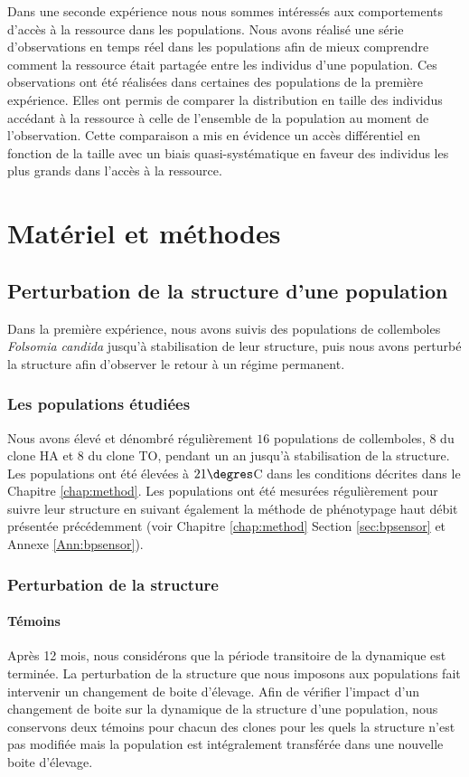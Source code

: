 Dans une seconde expérience nous nous sommes intéressés aux comportements
d'accès à la ressource dans les populations. Nous avons réalisé une série
d'observations en temps réel dans les populations afin de mieux comprendre
comment la ressource était partagée entre les individus d'une population. Ces
observations ont été réalisées dans certaines des populations de la première
expérience. Elles ont permis de comparer la distribution en taille des individus
accédant à la ressource à celle de l'ensemble de la population au moment de
l'observation. Cette comparaison a mis en évidence un accès différentiel en
fonction de la taille avec un biais quasi-systématique en faveur des individus
les plus grands dans l'accès à la ressource. 

\section{Matériel et méthodes}

\subsection{Perturbation de la structure d'une population}

Dans la première expérience, nous avons suivis des populations de collemboles
\textit{Folsomia candida} jusqu'à stabilisation de leur structure, puis nous
avons perturbé la structure afin d'observer le retour à un régime permanent. 

\subsubsection{Les populations étudiées}

Nous avons élevé et dénombré régulièrement $16$ populations de collemboles, $8$
du clone HA et $8$ du clone TO, pendant un an jusqu'à stabilisation de la
structure. Les populations ont été élevées à $21\degres$C dans les conditions
décrites dans le Chapitre \ref{chap:method}. Les populations ont été mesurées
régulièrement pour suivre leur structure en suivant également la méthode de
phénotypage haut débit présentée précédemment (voir Chapitre \ref{chap:method}
Section \ref{sec:bpsensor} et Annexe \ref{Ann:bpsensor}).

\subsubsection{Perturbation de la structure}

\paragraph{Témoins} Après 12 mois, nous considérons que la période transitoire
de la dynamique est terminée. La perturbation de la structure que nous imposons
aux populations fait intervenir un changement de boite d'élevage. Afin de
vérifier l'impact d'un changement de boite sur la dynamique de la structure
d'une population, nous conservons deux témoins pour chacun des clones pour les
quels la structure n'est pas modifiée mais la population est intégralement
transférée dans une nouvelle boite d'élevage.

